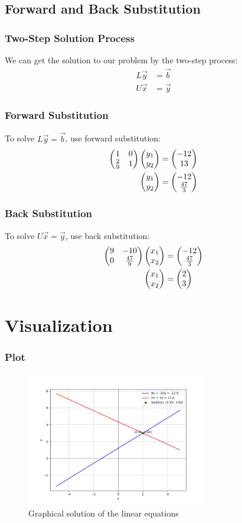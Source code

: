 \documentclass{beamer}
\begin{document}
\subsection{Forward and Back Substitution}
\begin{frame}
\frametitle{Two-Step Solution Process}
We can get the solution to our problem by the two-step process:
\begin{align}
    L\vec{y} &= \vec{b}\\
    U\vec{x} &= \vec{y}
\end{align}
\end{frame}

\begin{frame}
\frametitle{Forward Substitution}
To solve $L\vec{y} = \vec{b}$, use forward substitution:
\begin{align}
    \begin{pmatrix}1 & 0\\ \frac{2}{9} & 1\end{pmatrix}\begin{pmatrix}y_1 \\ y_2\end{pmatrix} &= \begin{pmatrix}-12 \\ 13\end{pmatrix}\\
    \begin{pmatrix}y_1 \\ y_2\end{pmatrix} &= \begin{pmatrix}-12 \\ \frac{47}{3}\end{pmatrix}
\end{align}
\end{frame}

\begin{frame}
\frametitle{Back Substitution}
To solve $U\vec{x} = \vec{y}$, use back substitution:
\begin{align}
    \begin{pmatrix}9 & -10\\ 0 & \frac{47}{9}\end{pmatrix}\begin{pmatrix}x_1 \\ x_2\end{pmatrix} &= \begin{pmatrix}-12 \\ \frac{47}{3}\end{pmatrix}\\
    \begin{pmatrix}x_1 \\ x_2\end{pmatrix} &= \begin{pmatrix}2 \\ 3\end{pmatrix}
\end{align}
\end{frame}

\section{Visualization}
\begin{frame}
\frametitle{Plot}
\begin{figure}[H]
    \centering
    \includegraphics[width=0.7\textwidth]{figs/plot.png}
    \caption{Graphical solution of the linear equations}
\end{figure}
\end{frame}
\end{document}
